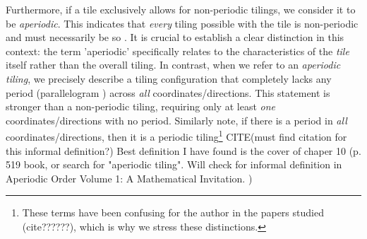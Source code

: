 \documentclass[../thesis.tex]{subfiles}
\begin{document}
Furthermore, if a tile exclusively allows for non-periodic tilings, we consider it to be \emph{aperiodic}. This indicates that \emph{every} tiling possible with the tile is non-periodic and must necessarily be so \cite[p. 520]{grunbaumTilingsPatterns1987}. It is crucial to establish a clear distinction in this context: the term 'aperiodic' specifically relates to the characteristics of the \emph{tile} itself rather than the overall tiling. In contrast, when we refer to an \emph{aperiodic tiling}, we precisely describe a tiling configuration that completely lacks any period (parallelogram ) across \emph{all} coordinates/directions. This statement is stronger than a non-periodic tiling, requiring only at least \emph{one} coordinates/directions with no period. Similarly note, if there is a period in \emph{all} coordinates/directions, then it is a periodic tiling\footnote[1]{These terms have been confusing for the author in the papers studied (cite??????), which is why we stress these distinctions.} CITE(must find citation for this informal definition?) Best definition I have found is the cover of chaper 10 (p. 519 book, or search for "aperiodic tiling". Will check for informal definition in Aperiodic Order
Volume 1: A Mathematical Invitation. )
\end{document}
